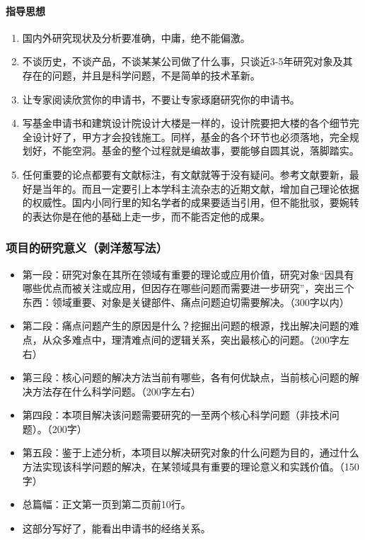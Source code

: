 \paragraph{指导思想}
\begin{enumerate}
\item 国内外研究现状及分析要准确，中庸，绝不能偏激。
\item 不谈历史，不谈产品，不谈某某公司做了什么事，只谈近3-5年研究对象及其存在的问题，并且是科学问题，不是简单的技术革新。
\item 让专家阅读欣赏你的申请书，不要让专家琢磨研究你的申请书。
\item 写基金申请书和建筑设计院设计大楼是一样的，设计院要把大楼的各个细节完全设计好了，甲方才会投钱施工。同样，基金的各个环节也必须落地，完全规划好，不能空洞。基金的整个过程就是编故事，要能够自圆其说，落脚踏实。
\item 任何重要的论点都要有文献标注，有文献就等于没有疑问。参考文献要新，最好是当年的。而且一定要引上本学科主流杂志的近期文献，增加自己理论依据的权威性。国内小同行里的知名学者的成果要适当引用，但不能批驳，要婉转的表达你是在他的基础上走一步，而不能否定他的成果。
\end{enumerate}


\subsubsection{项目的研究意义（剥洋葱写法）}
\begin{itemize}
\item 第一段：研究对象在其所在领域有重要的理论或应用价值，研究对象“因具有哪些优点而被关注或应用，但因存在哪些问题而需要进一步研究”，突出三个东西：领域重要、对象是关键部件、痛点问题迫切需要解决。（300字以内）

\item 第二段：痛点问题产生的原因是什么？挖掘出问题的根源，找出解决问题的难点，从众多难点中，理清难点间的逻辑关系，突出最核心的问题。（200字左右）

\item 第三段：核心问题的解决方法当前有哪些，各有何优缺点，当前核心问题的解决方法存在什么科学问题。（200字左右）

\item 第四段：本项目解决该问题需要研究的一至两个核心科学问题（非技术问题）。（200字）

\item 第五段：鉴于上述分析，本项目以解决研究对象的什么问题为目的，通过什么方法实现该科学问题的解决，在某领域具有重要的理论意义和实践价值。（150字）

\item 总篇幅：正文第一页到第二页前10行。

\item {\color{red} 这部分写好了，能看出申请书的经络关系。}
\end{itemize}


